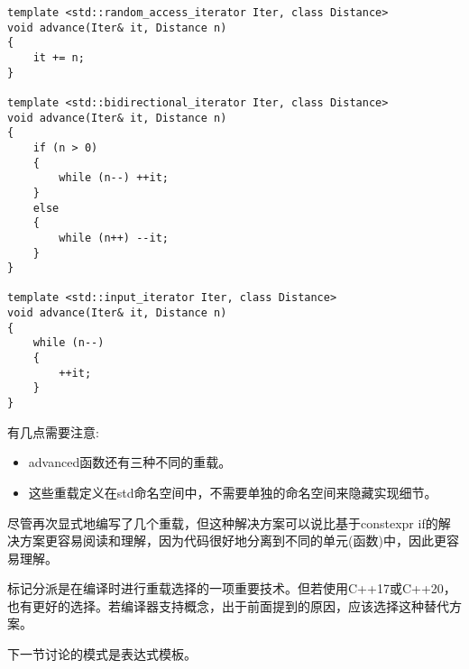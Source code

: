 \begin{lstlisting}[style=styleCXX]
template <std::random_access_iterator Iter, class Distance>
void advance(Iter& it, Distance n)
{
	it += n;
}

template <std::bidirectional_iterator Iter, class Distance>
void advance(Iter& it, Distance n)
{
	if (n > 0)
	{
		while (n--) ++it;
	}
	else
	{
		while (n++) --it;
	}
}

template <std::input_iterator Iter, class Distance>
void advance(Iter& it, Distance n)
{
	while (n--)
	{
		++it;
	}
}
\end{lstlisting}

有几点需要注意:

\begin{itemize}
\item
advanced函数还有三种不同的重载。

\item
这些重载定义在std命名空间中，不需要单独的命名空间来隐藏实现细节。
\end{itemize}

尽管再次显式地编写了几个重载，但这种解决方案可以说比基于constexpr if的解决方案更容易阅读和理解，因为代码很好地分离到不同的单元(函数)中，因此更容易理解。

标记分派是在编译时进行重载选择的一项重要技术。但若使用C++17或C++20，也有更好的选择。若编译器支持概念，出于前面提到的原因，应该选择这种替代方案。

下一节讨论的模式是表达式模板。


